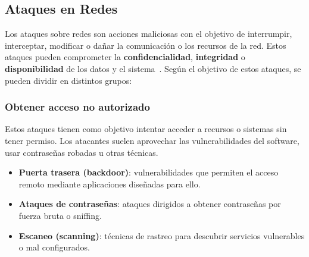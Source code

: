 \subsection{Ataques en Redes}
\label{subsec:Ataques}
Los ataques sobre redes son acciones maliciosas con el objetivo de interrumpir, interceptar, modificar o dañar la comunicación o los recursos de la red. Estos ataques pueden comprometer la \textbf{confidencialidad}, \textbf{integridad} o \textbf{disponibilidad} de los datos y el sistema~\cite{ataques}. Según el objetivo de estos ataques, se pueden dividir en distintos grupos:

\subsubsection{Obtener acceso no autorizado}
\label{subsubsec:AccessoNoAutorizado}
Estos ataques tienen como objetivo intentar acceder a recursos o sistemas sin tener permiso. Los atacantes suelen aprovechar las vulnerabilidades del software, usar contraseñas robadas u otras técnicas.
\begin{itemize}
    \item \textbf{Puerta trasera (backdoor)}: vulnerabilidades que permiten el acceso remoto mediante aplicaciones diseñadas para ello.
    \item \textbf{Ataques de contraseñas}: ataques dirigidos a obtener contraseñas por fuerza bruta o sniffing.
    \item \textbf{Escaneo (scanning)}: técnicas de rastreo para descubrir servicios vulnerables o mal configurados.
\end{itemize}

